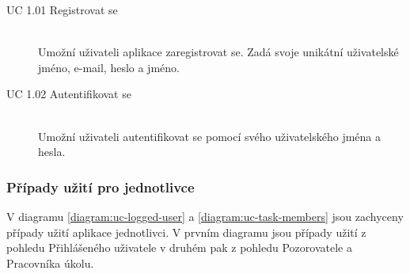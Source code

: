 \documentclass[thesis=B,czech]{FITthesis}[2012/06/26]
\begin{document}
			\begin{description}
				\item[UC 1.01 Registrovat se] \hfill \\
					Umožní uživateli aplikace zaregistrovat se. Zadá svoje unikátní uživatelské jméno, e-mail, heslo a jméno.
					
				\item[UC 1.02 Autentifikovat se] \hfill \\
					Umožní uživateli autentifikovat se pomocí svého uživatelského jména a hesla.	
					
			\end{description}
		
		
			\subsubsection{Případy užití pro jednotlivce}	
			V diagramu \ref{diagram:uc-logged-user} a \ref{diagram:uc-task-members} jsou zachyceny případy užití aplikace jednotlivci. V prvním diagramu jsou případy užití z pohledu Přihlášeného uživatele v druhém pak z pohledu Pozorovatele a Pracovníka úkolu.
			
			
			
\end{document}
